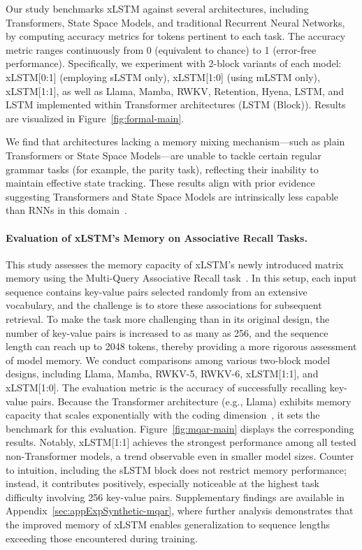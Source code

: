 Our study benchmarks xLSTM against several architectures, including Transformers, State Space Models, and traditional Recurrent Neural Networks, by computing accuracy metrics for tokens pertinent to each task. The accuracy metric ranges continuously from 0 (equivalent to chance) to 1 (error-free performance). Specifically, we experiment with 2-block variants of each model: xLSTM[0:1] (employing sLSTM only), xLSTM[1:0] (using mLSTM only), xLSTM[1:1], as well as Llama, Mamba, RWKV, Retention, Hyena, LSTM, and LSTM implemented within Transformer architectures (LSTM (Block)). Results are visualized in Figure~\ref{fig:formal-main}. 

We find that architectures lacking a memory mixing mechanism—such as plain Transformers or State Space Models—are unable to tackle certain regular grammar tasks (for example, the parity task), reflecting their inability to maintain effective state tracking. These results align with prior evidence suggesting Transformers and State Space Models are intrinsically less capable than RNNs in this domain~\citep{Merrill:24, Merrill:23, Deletang:23}.

\paragraph{Evaluation of xLSTM's Memory on Associative Recall Tasks.} This study assesses the memory capacity of xLSTM's newly introduced matrix memory using the Multi-Query Associative Recall task~\citep{Arora:23arxiv}. In this setup, each input sequence contains key-value pairs selected randomly from an extensive vocabulary, and the challenge is to store these associations for subsequent retrieval. To make the task more challenging than in its original design, the number of key-value pairs is increased to as many as 256, and the sequence length can reach up to 2048 tokens, thereby providing a more rigorous assessment of model memory. We conduct comparisons among various two-block model designs, including Llama, Mamba, RWKV-5, RWKV-6, xLSTM[1:1], and xLSTM[1:0]. The evaluation metric is the accuracy of successfully recalling key-value pairs. Because the Transformer architecture (e.g., Llama) exhibits memory capacity that scales exponentially with the coding dimension~\citep{Ramsauer:21}, it sets the benchmark for this evaluation. Figure~\ref{fig:mqar-main} displays the corresponding results. Notably, xLSTM[1:1] achieves the strongest performance among all tested non-Transformer models, a trend observable even in smaller model sizes. Counter to intuition, including the sLSTM block does not restrict memory performance; instead, it contributes positively, especially noticeable at the highest task difficulty involving 256 key-value pairs. Supplementary findings are available in Appendix~\ref{sec:appExpSynthetic-mqar}, where further analysis demonstrates that the improved memory of xLSTM enables generalization to sequence lengths exceeding those encountered during training.

